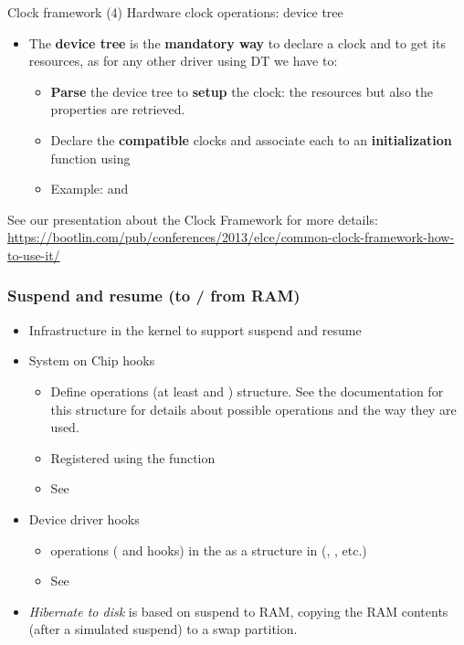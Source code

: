 \begin{frame}{Clock framework (4)}
  Hardware clock operations: device tree
  \begin{itemize}
  \item The \textbf{device tree} is the \textbf{mandatory way} to
    declare a clock and to get its resources, as for any other
    driver using DT we have to:
    \begin{itemize}
    \item \textbf{Parse} the device tree to \textbf{setup} the
      clock: the resources but also the properties are retrieved.
    \item Declare the \textbf{compatible} clocks and associate each
      to an \textbf{initialization} function using
    \item Example:  and
    \end{itemize}
  \end{itemize}
  See our presentation about the Clock Framework for more details:\\
  \scriptsize \url{https://bootlin.com/pub/conferences/2013/elce/common-clock-framework-how-to-use-it/}
\end{frame}

\begin{frame}
  \frametitle{Suspend and resume (to / from RAM)}
  \begin{itemize}
  \item Infrastructure in the kernel to support suspend and resume
  \item System on Chip hooks
    \begin{itemize}
    \item Define operations (at least  and )
       structure. See the documentation
      for this structure for details about possible operations and the
      way they are used.
    \item Registered using the  function
    \item See 
    \end{itemize}
  \item Device driver hooks
    \begin{itemize}
    \item {} operations ( and
       hooks) in the
       as a 
      structure in (, , etc.)
    \item See 
    \end{itemize}
   \item {\em Hibernate to disk} is based on suspend to RAM, copying
    the RAM contents (after a simulated suspend) to a swap partition.
  \end{itemize}
\end{frame}

